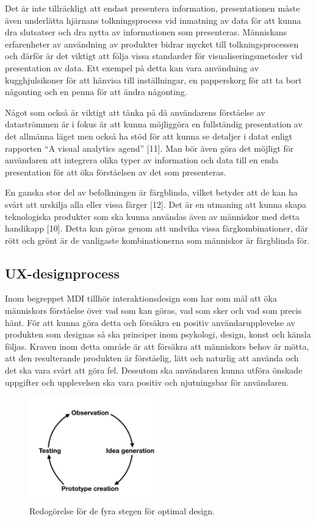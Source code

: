 \documentclass[12pt]{kththesis}
\begin{document}
Det är inte tillräckligt att endast presentera information, presentationen måste även underlätta hjärnans tolkningsprocess vid inmatning av data för att kunna dra slutsatser och dra nytta av informationen som presenteras. Människans erfarenheter av användning av produkter bidrar mycket till tolkningsprocessen och därför är det viktigt att följa vissa standarder för visualiseringsmetoder vid presentation av data. Ett exempel på detta kan vara användning av kugghjulsikoner för att hänvisa till inställningar, en papperskorg för att ta bort någonting och en penna för att ändra någonting. 

Något som också är viktigt att tänka på då användarens förståelse av dataströmmen är i fokus är att kunna möjliggöra en fullständig presentation av det allmänna läget men också ha stöd för att kunna se detaljer i datat enligt rapporten “A visual analytics agend” [11]. Man bör även göra det möjligt för användaren att integrera olika typer av information och data till en enda presentation för att öka förståelsen av det som presenteras.

En ganska stor del av befolkningen är färgblinda, vilket betyder att de kan ha svårt att urskilja alla eller vissa färger [12]. Det är en utmaning att kunna skapa teknologiska produkter som ska kunna användas även av människor med detta handikapp [10]. Detta kan göras genom att undvika vissa färgkombinationer, där rött och grönt är de vanligaste kombinationerna som människor är färgblinda för.


\subsection{UX-designprocess}


Inom begreppet MDI tillhör interaktionsdesign som har som mål att öka människors förståelse över vad som kan göras, vad som sker och vad som precis hänt. För att kunna göra detta och försäkra en positiv användarupplevelse av produkten som designas så ska principer inom psykologi, design, konst och känsla följas. Kraven inom detta område är att försäkra att människors behov är mötta, att den resulterande produkten är förståelig, lätt och naturlig att använda och det ska vara svårt att göra fel. Dessutom ska användaren kunna utföra önskade uppgifter och upplevelsen ska vara positiv och njutningsbar för användaren.           

\captionsetup[figure]{name=Figur}

\begin{figure}[h]
\centering
\includegraphics[width=0.5\textwidth]{PrototypeCreation}
\caption{Redogörelse för de fyra stegen för optimal design.}
\end{figure}
\end{document}

